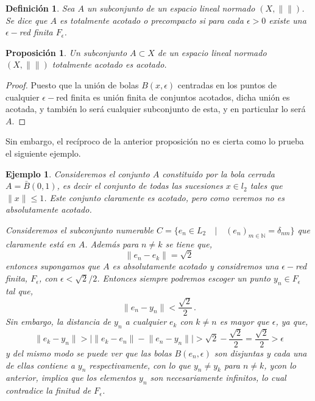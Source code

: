 \documentclass[12pt]{book}
\newtheorem{defn}{\bf Definición}[chapter]
\newtheorem{ejemplo}{\bf Ejemplo}[chapter]
\newtheorem{prop}{\bf Proposición}[chapter]
\def\NN{\mathbb{N}}
\newcommand{\abs}[1]{\lvert #1\rvert }
\newcommand{\norm}[1]{\lVert #1\rVert }
\begin{document}
 

\begin{defn} Sea $A$ un subconjunto de un espacio lineal normado $(X,\norm{})$. Se dice que $A$ 
es  {\emph totalmente acotado o  precompacto} si para cada $\epsilon>0$ existe una $\epsilon-
$red finita  $F_\epsilon$.
\end{defn}

\begin{prop}  Un subconjunto $A\subset X$ de un espacio lineal normado $(X,\norm{})$ totalmente 
acotado es acotado.
\end{prop}
\begin{proof}
Puesto que la unión de bolas $B(x,\epsilon)$ centradas en los puntos  de cualquier    $\epsilon-
$red finita es unión finita de conjuntos acotados, dicha unión es  acotada, y también lo será 
cualquier subconjunto de esta, y en particular lo será $A$.
\end{proof}
Sin embargo, el recíproco de la  anterior proposición no es cierta como lo prueba el siguiente 
ejemplo.
\begin{ejemplo}  Consideremos el conjunto $A$ constituido por la bola cerrada $A=\bar{B}(0,1)$, es 
decir el conjunto de todas las sucesiones  $x\in l_2$ tales que $\norm{x}\leq 1$. Este conjunto 
claramente  es acotado, pero como veremos no es absolutamente acotado.

Consideremos el subconjunto numerable $C=\{e_n\in L_2\quad|\quad (e_n)_{m\in \NN}
=\delta_{nm}\}$ que claramente está en $A$. Además para $n\not= k$ se tiene que,
$$\norm{e_n-e_k}=\sqrt{2}$$
entonces supongamos que $A$  es absolutamente acotado y considremos una $\epsilon-$red  
finita, $F_\epsilon$, con $\epsilon<\sqrt{2}/2$. Entonces siempre podremos escoger un punto 
$y_n\in F_{\epsilon}$ tal que,
$$\norm{e_n-y_n}<\frac{\sqrt{2}}{2}\,.$$
Sin embargo, la distancia de  $y_n$ a cualquier $e_k$ con $k\not= n$ es mayor que $\epsilon$, ya 
que,
$$\norm{e_k-y_n}>\abs{\norm{e_k-e_n}-\norm{e_n-y_n}}> \sqrt{2}  - \frac{\sqrt{2}}{2}=\frac{\sqrt{2}}
{2}>\epsilon$$
y del mismo modo se puede ver que las bolas $B(e_n,\epsilon)$ son disjuntas y cada una de ellas 
contiene a $y_n$ respectivamente, con lo que $y_n\not=y_k$ para $n\not=k$, ycon lo anterior,
 implica que los elementos $y_n$ son necesariamente  infinitos, lo cual contradice la finitud de 
$F_\epsilon$. 
\end{ejemplo}
\end{document}
